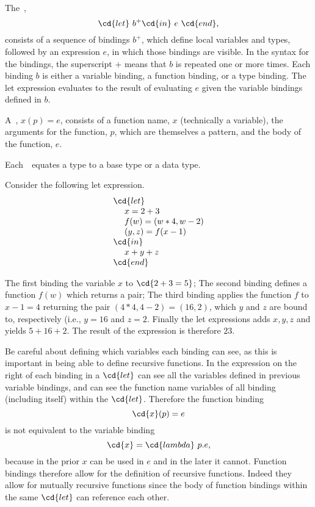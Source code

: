 \begin{gram}[Bindings]

The~, 
\[
\cd{let}~b^+\cd{in}~e~\cd{end},
\] 
%
consists of a sequence of bindings $b^+$, which define local variables
and types, followed by an expression $e$, in which those bindings are
visible.  In the syntax for the bindings, the superscript $+$ means
that $b$ is repeated one or more times.  Each binding $b$ is either a
variable binding, a function binding, or a type binding.
%
The let expression evaluates to the result of evaluating $e$ given the
variable bindings defined in $b$.

A~, $x (p) = e$, consists of a function
name, $x$ (technically a variable), the arguments for the function,
$p$, which are themselves a pattern, and the body of the function,
$e$. 

%

Each~~equates a type to a base type or a data type.
\end{gram}

\begin{example}
Consider the following let expression.
\[
\begin{array}{l}
\cd{let}\\ 
~~~~x = 2 + 3\\
~~~~f (w) = (w * 4, w - 2)\\
~~~~(y,z) = f(x-1)\\
\cd{in}\\ 
~~~~x + y + z\\
\cd{end} 
\end{array}
\]

The first  binding the variable $x$ to $\cd{2 + 3 = 5}$;
%
The second binding defines a function $f(w)$ which returns a pair;
%
The third binding applies the function $f$ to $x - 1 = 4$
returning the pair $(4 * 4, 4 -2) = (16, 2)$, which
  $y$ and $z$ are bound to, respectively (i.e., $y = 16$ and
  $z = 2$.
%
Finally the let expressions adds $x, y, z$ and yields $5 + 16 + 2$.
The result of the expression is therefore $23$.
\end{example}

\begin{note}
Be careful about defining which variables each binding can see, as
this is important in being able to define recursive functions.  In
\pml{} the expression on the right of each binding in a $\cd{let}$ can
see all the variables defined in previous variable bindings, and can
see the function name variables of all binding (including itself)
within the $\cd{let}$.
%
Therefore the function binding
%
\[
\cd{x}(p) = e
\]
%
is not equivalent to the variable binding
%
\[
\cd{x} = \cd{lambda}~p.e,
\]
%
because in the prior $x$ can be used
in $e$ and in the later it cannot.
%
Function bindings therefore allow for the definition of
recursive functions.  
%
Indeed they allow for mutually recursive functions since the body of
function bindings within the same $\cd{let}$ can reference each other.
\end{note}

